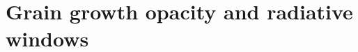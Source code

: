 \documentclass[apj]{emulateapj}
\newcommand{\delad}{\nabla_{\rm ad}}
\begin{document}

%
%
%
%

\section{Grain growth opacity and radiative windows} \label{radwindow}
\end{document}
